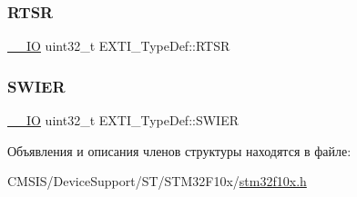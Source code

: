 \mbox{\label{struct_e_x_t_i___type_def_ac019d211d8c880b327a1b90a06cc0675}} 
\subsubsection{\texorpdfstring{RTSR}{RTSR}}
{\footnotesize\ttfamily \mbox{\hyperlink{group___c_m_s_i_s___c_m3__core__definitions_gaec43007d9998a0a0e01faede4133d6be}{\+\_\+\+\_\+\+IO}} uint32\+\_\+t E\+X\+T\+I\+\_\+\+Type\+Def\+::\+R\+T\+SR}

\mbox{\label{struct_e_x_t_i___type_def_a5c1f538e64ee90918cd158b808f5d4de}} 
\subsubsection{\texorpdfstring{SWIER}{SWIER}}
{\footnotesize\ttfamily \mbox{\hyperlink{group___c_m_s_i_s___c_m3__core__definitions_gaec43007d9998a0a0e01faede4133d6be}{\+\_\+\+\_\+\+IO}} uint32\+\_\+t E\+X\+T\+I\+\_\+\+Type\+Def\+::\+S\+W\+I\+ER}



Объявления и описания членов структуры находятся в файле\+:\begin{DoxyCompactItemize}
\item 
C\+M\+S\+I\+S/\+Device\+Support/\+S\+T/\+S\+T\+M32\+F10x/\mbox{\hyperlink{stm32f10x_8h}{stm32f10x.\+h}}\end{DoxyCompactItemize}
